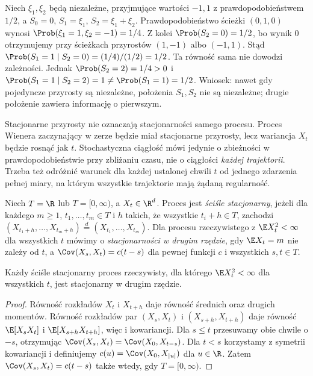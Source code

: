 \begin{przyklad}
Niech $\xi_1,\xi_2$ będą niezależne, przyjmujące
wartości $-1,1$ z prawdopodobieństwem $1/2$,
a $S_0=0$, $S_1=\xi_1$, $S_2=\xi_1+\xi_2$.
Prawdopodobieństwo ścieżki $(0,1,0)$ wynosi
$\Prob(\xi_1=1,\xi_2=-1)=1/4$.
Z kolei $\Prob(S_2=0)=1/2$, bo wynik $0$ otrzymujemy
przy ścieżkach przyrostów $(1,-1)$ albo $(-1,1)$.
Stąd $\Prob(S_1=1\mid S_2=0)=(1/4)/(1/2)=1/2$.
Ta równość sama nie dowodzi zależności.
Jednak $\Prob(S_2=2)=1/4>0$ i
$\Prob(S_1=1\mid S_2=2)=1\ne\Prob(S_1=1)=1/2$.
Wniosek: nawet gdy pojedyncze przyrosty są niezależne,
położenia $S_1,S_2$ nie są niezależne; drugie położenie
zawiera informację o pierwszym.
\end{przyklad}

\begin{uwaga}
Stacjonarne przyrosty nie oznaczają stacjonarności samego procesu.
Proces Wienera zaczynający w zerze będzie miał stacjonarne
przyrosty, lecz wariancja $X_t$ będzie rosnąć jak $t$.
Stochastyczna ciągłość mówi jedynie o zbieżności w prawdopodobieństwie
przy zbliżaniu czasu, nie o ciągłości \emph{każdej trajektorii}.
Trzeba też odróżnić warunek dla każdej ustalonej chwili $t$
od jednego zdarzenia pełnej miary, na którym wszystkie trajektorie
mają żądaną regularność.
\end{uwaga}

\begin{definicja}
Niech $T=\R$ lub $T=[0,\infty)$, a $X_t\in\R^d$.
Proces jest \emph{ściśle stacjonarny}, jeżeli dla każdego
$m\ge1$, $t_1,\ldots,t_m\in T$ i $h$ takich, że wszystkie
$t_i+h\in T$, zachodzi
$(X_{t_1+h},\ldots,X_{t_m+h})\overset{d}= (X_{t_1},\ldots,X_{t_m})$.
Dla procesu rzeczywistego z $\E X_t^2<\infty$ dla wszystkich $t$
mówimy o \emph{stacjonarności w drugim rzędzie}, gdy
$\E X_t=m$ nie zależy od $t$, a $\Cov(X_s,X_t)=c(t-s)$
dla pewnej funkcji $c$ i wszystkich $s,t\in T$.
\end{definicja}

\begin{twierdzenie}
Każdy ściśle stacjonarny proces rzeczywisty,
dla którego $\E X_t^2<\infty$ dla wszystkich $t$,
jest stacjonarny w drugim rzędzie.
\end{twierdzenie}
\begin{proof}
Równość rozkładów $X_t$ i $X_{t+h}$ daje równość średnich
oraz drugich momentów. Równość rozkładów par
$(X_s,X_t)$ i $(X_{s+h},X_{t+h})$ daje równość
$\E[X_sX_t]$ i $\E[X_{s+h}X_{t+h}]$, więc i kowariancji.
Dla $s\le t$ przesuwamy obie chwile o $-s$, otrzymując
$\Cov(X_s,X_t)=\Cov(X_0,X_{t-s})$.
Dla $t<s$ korzystamy z symetrii kowariancji i definiujemy
$c(u)=\Cov(X_0,X_{|u|})$ dla $u\in\R$.
Zatem $\Cov(X_s,X_t)=c(t-s)$ także wtedy, gdy $T=[0,\infty)$.
\end{proof}

